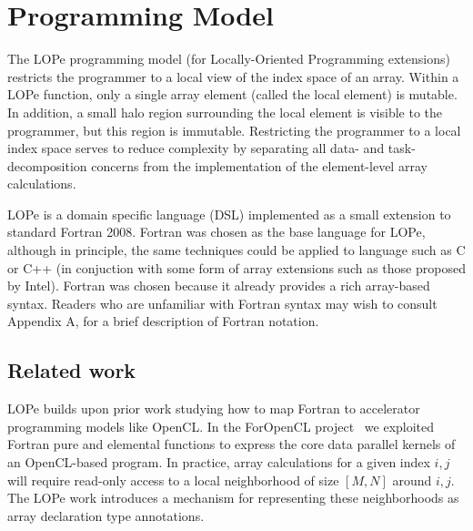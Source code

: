 \section{Programming Model}

The LOPe programming model (for Locally-Oriented Programming
extensions) restricts the programmer to a local view of the index
space of an array.  Within a LOPe function, only a single array
element (called the local element) is mutable.  In addition, a small
halo region surrounding the local element is visible to the
programmer, but this region is immutable.  Restricting the programmer
to a local index space serves to reduce complexity by separating all
data- and task-decomposition concerns from the implementation of the
element-level array calculations.


LOPe is a domain specific language (DSL) implemented as a small extension
to standard Fortran 2008.
Fortran was chosen as the base language for LOPe, although in
principle, the same techniques could be applied to language such as C
or C++ (in conjuction with some form of array extensions such as those
proposed by Intel).  Fortran was chosen because it already provides a
rich array-based syntax.  Readers who are unfamiliar with Fortran
syntax may wish to consult Appendix A, for a brief description of
Fortran notation.

\subsection{Related work}

LOPe builds upon prior work studying how to map Fortran to accelerator
programming models like OpenCL.  In the ForOpenCL project~\cite{foropencl}
we exploited Fortran pure and elemental functions to express the core
data parallel kernels of an OpenCL-based program.  In practice, array
calculations for a given index $i,j$ will require read-only access to
a local neighborhood of size $[M,N]$ around $i,j$.  The LOPe work introduces
a mechanism for representing these neighborhoods as array declaration
type annotations.

